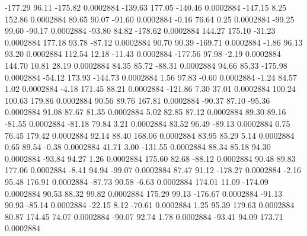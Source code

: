      -177.29       96.11     -175.82     0.0002884
     -139.63      177.05     -140.46     0.0002884
     -147.15        8.25      152.86     0.0002884
       89.65       90.07      -91.60     0.0002884
       -0.16       76.64        0.25     0.0002884
      -99.25       99.60      -90.17     0.0002884
      -93.80       84.82     -178.62     0.0002884
      144.27      175.10      -31.23     0.0002884
      177.18       93.78      -87.12     0.0002884
       90.70       90.39     -169.71     0.0002884
       -1.86       96.13       93.20     0.0002884
      112.54       12.18      -11.43     0.0002884
     -177.56       97.98       -2.19     0.0002884
      144.70       10.81       28.19     0.0002884
       84.35       85.72      -88.31     0.0002884
       94.66       85.33     -175.98     0.0002884
      -54.12      173.93     -144.73     0.0002884
        1.56       97.83       -0.60     0.0002884
       -1.24       84.57        1.02     0.0002884
       -4.18      171.45       88.21     0.0002884
     -121.86        7.30       37.01     0.0002884
      100.24      100.63      179.86     0.0002884
       90.56       89.76      167.81     0.0002884
      -90.37       87.10      -95.36     0.0002884
       91.08       87.67       81.35     0.0002884
        5.02       82.85       87.12     0.0002884
       89.30       89.16      -81.55     0.0002884
      -81.18       79.84        3.21     0.0002884
       83.52       96.49      -89.13     0.0002884
        0.75       76.45      179.42     0.0002884
       92.14       88.40      168.06     0.0002884
       83.95       85.29        5.14     0.0002884
        0.65       89.54       -0.38     0.0002884
       41.71        3.00     -131.55     0.0002884
       88.34       85.18       94.30     0.0002884
      -93.84       94.27        1.26     0.0002884
      175.60       82.68      -88.12     0.0002884
       90.48       89.83      177.06     0.0002884
       -8.41       94.94      -99.07     0.0002884
       87.47       91.12     -178.27     0.0002884
       -2.16       95.48      176.91     0.0002884
      -87.73       90.58       -6.63     0.0002884
      174.01       11.09     -174.09     0.0002884
       90.53       88.32       99.82     0.0002884
      175.29       99.13     -176.67     0.0002884
      -91.13       90.93      -85.14     0.0002884
      -22.15        8.12      -70.61     0.0002884
        1.25       95.39      179.63     0.0002884
       80.87      174.45       74.07     0.0002884
      -90.07       92.74        1.78     0.0002884
      -93.41       94.09      173.71     0.0002884
